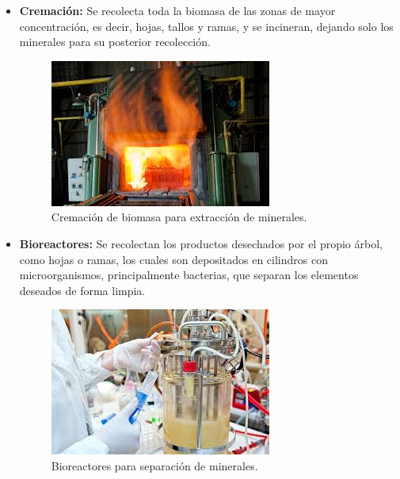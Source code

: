 \documentclass[twocolumn]{article}
\begin{document}
\begin{itemize}
    \item \textbf{Cremación:} Se recolecta toda la biomasa de las zonas de mayor concentración, es decir, hojas, tallos y ramas, y se incineran, dejando solo los minerales para su posterior recolección.
    \begin{figure}[!h]
        \centering
        \includegraphics[width=\linewidth]{imagenes/descarga (6).jpeg}
        \caption{Cremación de biomasa para extracción de minerales.}
    \end{figure}
    
    \item \textbf{Bioreactores:} Se recolectan los productos desechados por el propio árbol, como hojas o ramas, los cuales son depositados en cilindros con microorganismos, principalmente bacterias, que separan los elementos deseados de forma limpia. 
    \begin{figure}[!h]
        \centering
        \includegraphics[width=\linewidth]{imagenes/descarga (7).jpeg}
        \caption{Bioreactores para separación de minerales.}
    \end{figure}
\end{itemize}
\end{document}
